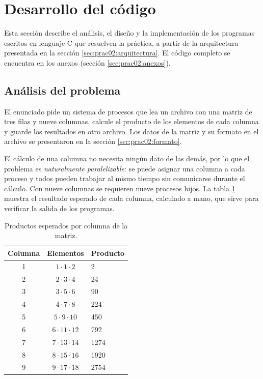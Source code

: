 
\section{Desarrollo del código}
\label{sec:prac02:desarrollo}

Esta sección describe el análisis, el diseño y la implementación de los programas escritos en lenguaje C que resuelven la práctica, a partir de la arquitectura presentada en la sección \ref{sec:prac02:arquitectura}. El código completo se encuentra en los anexos (sección \ref{sec:prac02:anexos}).

\subsection{Análisis del problema}
\label{sec:prac02:analisis}

El enunciado pide un sistema de procesos que lea un archivo con una matriz de tres filas y nueve columnas, calcule el producto de los elementos de cada columna y guarde los resultados en otro archivo. Los datos de la matriz y su formato en el archivo se presentaron en la sección \ref{sec:prac02:formato}.

El cálculo de una columna no necesita ningún dato de las demás, por lo que el problema es \emph{naturalmente paralelizable}: se puede asignar una columna a cada proceso y todos pueden trabajar al mismo tiempo sin comunicarse durante el cálculo. Con nueve columnas se requieren nueve procesos hijos. La tabla \ref{tab:prac02:productos} muestra el resultado esperado de cada columna, calculado a mano, que sirve para verificar la salida de los programas.

\begin{table}[H]
    \centering
    \caption{Productos esperados por columna de la matriz.}
    \label{tab:prac02:productos}
    \begin{tabular}{ccl}
        \toprule
        \textbf{Columna} & \textbf{Elementos} & \textbf{Producto} \\
        \midrule
        1 & $1 \cdot 1 \cdot 2$ & 2 \\
        2 & $2 \cdot 3 \cdot 4$ & 24 \\
        3 & $3 \cdot 5 \cdot 6$ & 90 \\
        4 & $4 \cdot 7 \cdot 8$ & 224 \\
        5 & $5 \cdot 9 \cdot 10$ & 450 \\
        6 & $6 \cdot 11 \cdot 12$ & 792 \\
        7 & $7 \cdot 13 \cdot 14$ & 1274 \\
        8 & $8 \cdot 15 \cdot 16$ & 1920 \\
        9 & $9 \cdot 17 \cdot 18$ & 2754 \\
        \bottomrule
    \end{tabular}
\end{table}

